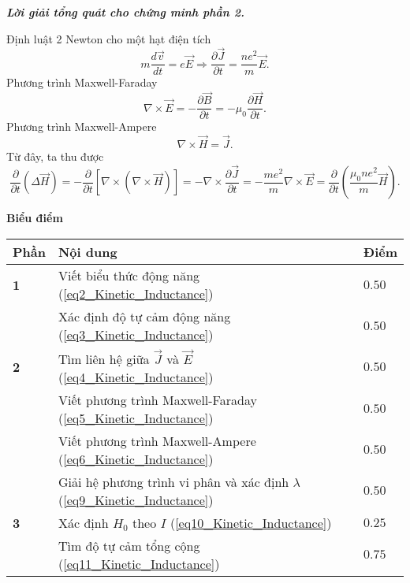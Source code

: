 \textbf{ \textit{Lời giải tổng quát cho chứng minh phần 2.}}

Định luật 2 Newton cho một hạt điện tích
\begin{equation} \label{eq17_Kinetic_Inductance}
    m\dfrac{d \Vec{v}}{dt} = e \Vec{E} \Rightarrow \dfrac{\partial \Vec{J}}{\partial t} = \dfrac{ne^2}{m} \Vec{E}.
\end{equation}
Phương trình Maxwell-Faraday
\begin{equation} \label{eq18_Kinetic_Inductance}
    \nabla \times \Vec{E} = - \dfrac{\partial \Vec{B}}{\partial t} = - \mu_0 \dfrac{\partial \Vec{H}}{\partial t}.
\end{equation}
Phương trình Maxwell-Ampere
\begin{equation} \label{eq19_Kinetic_Inductance}
    \nabla \times \Vec{H} = \Vec{J}.
\end{equation}
Từ đây, ta thu được
\begin{equation} \label{eq20_Kinetic_Inductance}
    \dfrac{\partial}{\partial t} \left( \Delta \Vec{H} \right) = - \dfrac{\partial}{\partial t} \left[ \nabla \times \left( \nabla \times \Vec{H} \right) \right] = - \nabla \times \dfrac{\partial \Vec{J}}{\partial t} =  -\dfrac{me^2}{m} \nabla \times \Vec{E} = \dfrac{\partial}{\partial t} \left( \dfrac{\mu_0 ne^2}{m} \Vec{H} \right).
\end{equation}

\textbf{Biểu điểm}
\begin{center}
\begin{tabular}{|>{\centering\arraybackslash}m{1cm}|>{\raggedright\arraybackslash}m{14cm}| >{\centering\arraybackslash}m{1cm}|}
    \hline
    \textbf{Phần} & \textbf{Nội dung} & \textbf{Điểm} \\
    \hline
    \textbf{1} & Viết biểu thức động năng (\ref{eq2_Kinetic_Inductance}) & $0.50$ \\
    \cline{2-3}
    & Xác định độ tự cảm động năng (\ref{eq3_Kinetic_Inductance}) & $0.50$ \\
    \hline
    \textbf{2} & Tìm liên hệ giữa $\Vec{J}$ và $\Vec{E}$ (\ref{eq4_Kinetic_Inductance}) & $0.50$ \\
    \cline{2-3} 
    & Viết phương trình Maxwell-Faraday (\ref{eq5_Kinetic_Inductance}) & $0.50$ \\
    \cline{2-3}
    & Viết phương trình Maxwell-Ampere (\ref{eq6_Kinetic_Inductance}) & $0.50$ \\
    \cline{2-3}
    & Giải hệ phương trình vi phân và xác định $\lambda$ (\ref{eq9_Kinetic_Inductance}) & $0.50$ \\
    \hline
    \textbf{3} & Xác định $H_0$ theo $I$ (\ref{eq10_Kinetic_Inductance}) & $0.25$ \\
    \cline{2-3}
    & Tìm độ tự cảm tổng cộng (\ref{eq11_Kinetic_Inductance}) & $0.75$ \\
    \hline
\end{tabular}
\end{center}

